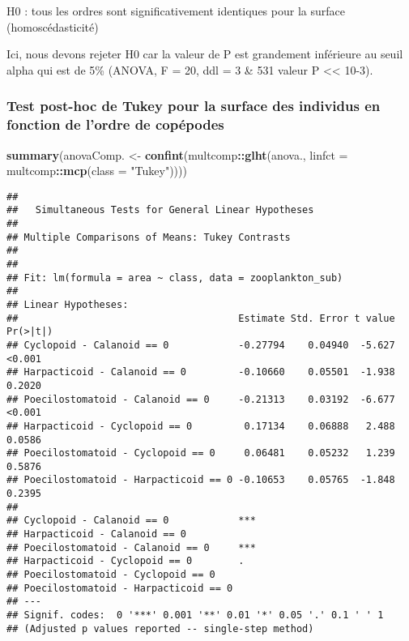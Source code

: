 \documentclass[]{article}
\newenvironment{Shaded}{\begin{snugshade}}{\end{snugshade}}
\newcommand{\KeywordTok}[1]{\textcolor[rgb]{0.13,0.29,0.53}{\textbf{#1}}}
\newcommand{\DataTypeTok}[1]{\textcolor[rgb]{0.13,0.29,0.53}{#1}}
\newcommand{\StringTok}[1]{\textcolor[rgb]{0.31,0.60,0.02}{#1}}
\newcommand{\OperatorTok}[1]{\textcolor[rgb]{0.81,0.36,0.00}{\textbf{#1}}}
\newcommand{\NormalTok}[1]{#1}
\begin{document}
H0 : tous les ordres sont significativement identiques pour la surface
(homoscédasticité)

Ici, nous devons rejeter H0 car la valeur de P est grandement inférieure
au seuil alpha qui est de 5\% (ANOVA, F = 20, ddl = 3 \& 531 valeur P
\textless{}\textless{} 10-3).

\subsubsection{Test post-hoc de Tukey pour la surface des individus en
fonction de l'ordre de
copépodes}\label{test-post-hoc-de-tukey-pour-la-surface-des-individus-en-fonction-de-lordre-de-copepodes}

\begin{Shaded}
\begin{Highlighting}[]
\KeywordTok{summary}\NormalTok{(anovaComp. <-}\StringTok{ }\KeywordTok{confint}\NormalTok{(multcomp}\OperatorTok{::}\KeywordTok{glht}\NormalTok{(anova.,}
  \DataTypeTok{linfct =}\NormalTok{ multcomp}\OperatorTok{::}\KeywordTok{mcp}\NormalTok{(}\DataTypeTok{class =} \StringTok{"Tukey"}\NormalTok{))))}
\end{Highlighting}
\end{Shaded}

\begin{verbatim}
## 
##   Simultaneous Tests for General Linear Hypotheses
## 
## Multiple Comparisons of Means: Tukey Contrasts
## 
## 
## Fit: lm(formula = area ~ class, data = zooplankton_sub)
## 
## Linear Hypotheses:
##                                      Estimate Std. Error t value Pr(>|t|)
## Cyclopoid - Calanoid == 0            -0.27794    0.04940  -5.627   <0.001
## Harpacticoid - Calanoid == 0         -0.10660    0.05501  -1.938   0.2020
## Poecilostomatoid - Calanoid == 0     -0.21313    0.03192  -6.677   <0.001
## Harpacticoid - Cyclopoid == 0         0.17134    0.06888   2.488   0.0586
## Poecilostomatoid - Cyclopoid == 0     0.06481    0.05232   1.239   0.5876
## Poecilostomatoid - Harpacticoid == 0 -0.10653    0.05765  -1.848   0.2395
##                                         
## Cyclopoid - Calanoid == 0            ***
## Harpacticoid - Calanoid == 0            
## Poecilostomatoid - Calanoid == 0     ***
## Harpacticoid - Cyclopoid == 0        .  
## Poecilostomatoid - Cyclopoid == 0       
## Poecilostomatoid - Harpacticoid == 0    
## ---
## Signif. codes:  0 '***' 0.001 '**' 0.01 '*' 0.05 '.' 0.1 ' ' 1
## (Adjusted p values reported -- single-step method)
\end{verbatim}
\end{document}
